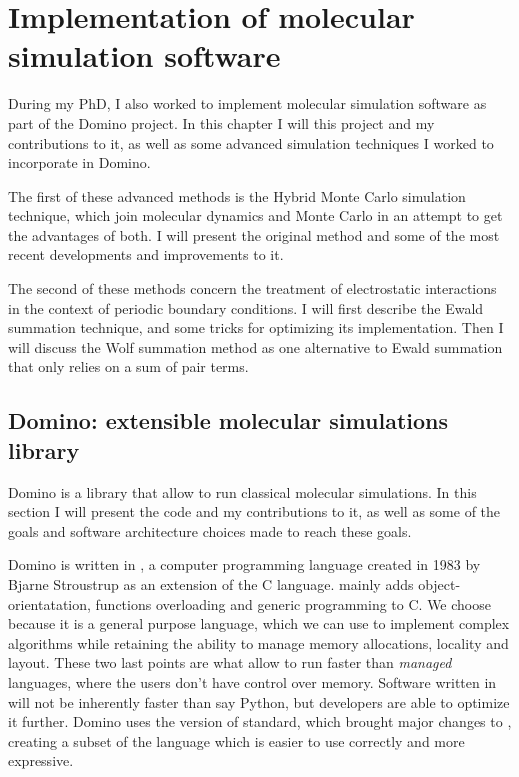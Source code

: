 \documentclass[thesis]{subfiles}
\begin{document}
\OnlyInSubfile{\setcounter{chapter}{5}}

\chapter{Implementation of molecular simulation software}

During my PhD, I also worked to implement molecular simulation software as part
of the Domino project. In this chapter I will this project and my contributions
to it, as well as some advanced simulation techniques I worked to incorporate in
Domino.

The first of these advanced methods is the Hybrid Monte Carlo simulation
technique, which join molecular dynamics and Monte Carlo in an attempt to get
the advantages of both. I will present the original method and some of the most
recent developments and improvements to it.

The second of these methods concern the treatment of electrostatic interactions
in the context of periodic boundary conditions. I will first describe the Ewald
summation technique, and some tricks for optimizing its implementation. Then I
will discuss the Wolf summation method as one alternative to Ewald summation
that only relies on a sum of pair terms.

\newpage
\section{Domino: extensible molecular simulations library}

Domino is a \cxx library that allow to run classical molecular simulations. In
this section I will present the code and my contributions to it, as well as some
of the goals and software architecture choices made to reach these goals.

Domino is written in \cxx, a computer programming language created in 1983 by
Bjarne Stroustrup as an extension of the C language. \cxx mainly adds
object-orientatation, functions overloading and generic programming to C. We
choose \cxx because it is a general purpose language, which we can use to
implement complex algorithms while retaining the ability to manage memory
allocations, locality and layout. These two last points are what allow \cxx to
run faster than \emph{managed} languages, where the users don't have control
over memory. Software written in \cxx will not be inherently faster than say
Python, but developers are able to optimize it further. Domino uses the 
version of \cxx standard, which brought major changes to \cxx, creating a subset
of the language which is easier to use correctly and more expressive.
\end{document}
